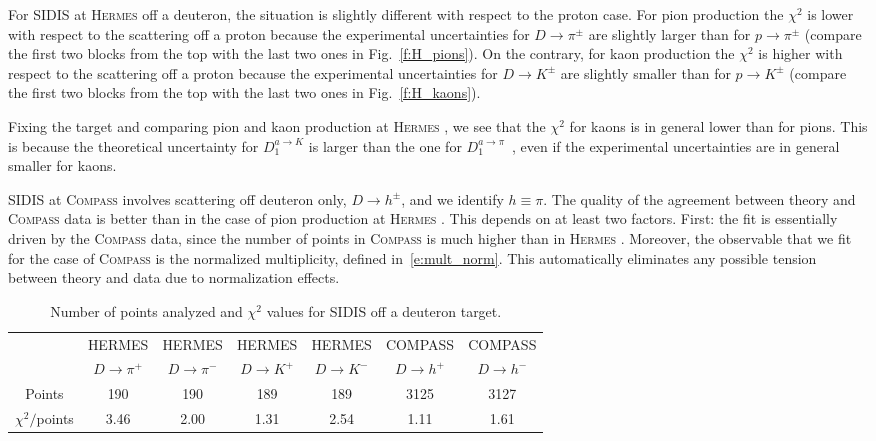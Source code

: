 \documentclass[aps,preprintnumbers,showpacs,nofootinbib,superscriptaddress,floatfix]{revtex4}
\newcommand{\hermes}{\textsc{Hermes }}
\newcommand{\compass}{\textsc{Compass }}
\begin{document}
For SIDIS at \hermes off a deuteron, the situation is slightly different with respect to the proton case.
For pion production the $\chi^2$ is lower with respect to the scattering off a proton because the experimental uncertainties for $D \to \pi^\pm$ are slightly larger than for $p \to \pi^\pm$ (compare the first two blocks from the top with the last two ones in Fig.~\ref{f:H_pions}).
On the contrary, for kaon production the $\chi^2$ is higher with respect to the scattering off a proton because the experimental uncertainties for $D \to K^\pm$ are slightly smaller than for $p \to K^\pm$ (compare the first two blocks from the top with the last two ones in Fig.~\ref{f:H_kaons}).

Fixing the target and comparing pion and kaon production at \hermes, we see that the $\chi^2$ for kaons is in general lower than for pions. This is because the theoretical uncertainty for $D_1^{a \to K}$ is larger than the one for $D_1^{a \to \pi}$~\cite{Epele:2012vg,Signori:2013mda}, even if the experimental uncertainties are in general smaller for kaons.

SIDIS at \compass involves scattering off deuteron only, $D \to h^\pm$, and we identify $h \equiv \pi$. 
The quality of the agreement between theory and \compass data is better than in the case of pion production at \hermes. This depends on at least two factors. First: the fit is essentially driven by the \compass data, since the number of points in \compass is much higher than in \hermes. Moreover, the observable that we fit for the case of \compass is the normalized multiplicity, defined in~\eqref{e:mult_norm}. This automatically eliminates any possible tension between theory and data due to normalization effects.
\begin{table}[h!]
\begin{center}
\begin{tabular}{|c|c|c|c|c|c|c|}
 \hline
\hline
  & HERMES & HERMES & HERMES & HERMES & COMPASS & COMPASS\\
 ~          &  $D \to \pi^+$    &   $D \to \pi^-$    &  $D \to K^+$    &   $D \to K^-$      &  $D \to h^+$    &   $D \to h^-$            \\
\hline
 Points         &  190 & 190 & 189 & 189   & 3125 & 3127   \\
 \hline
$\chi^2 /$points &3.46 & 2.00 & 1.31 & 2.54  & 1.11 & 1.61 \\            
 \hline
 \hline
\end{tabular}
\caption{Number of points analyzed and $\chi^2$ values for SIDIS off a deuteron target.} 
\label{t:fl_ind_chi2_eD}
\end{center}
\end{table}
\end{document}
